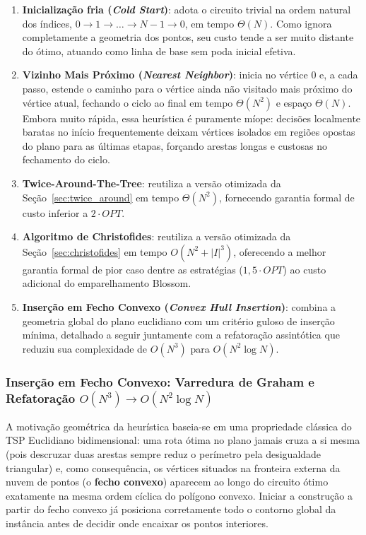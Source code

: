 \begin{enumerate}
  \item \textbf{Inicialização fria (\textit{Cold Start})}: adota o circuito trivial na ordem
  natural dos índices, $0 \rightarrow 1 \rightarrow \dots \rightarrow N - 1 \rightarrow 0$, em
  tempo $\Theta(N)$. Como ignora completamente a geometria dos pontos, seu custo tende a ser
  muito distante do ótimo, atuando como linha de base sem poda inicial efetiva.

  \item \textbf{Vizinho Mais Próximo (\textit{Nearest Neighbor})}: inicia no vértice $0$ e, a
  cada passo, estende o caminho para o vértice ainda não visitado mais próximo do vértice atual,
  fechando o ciclo ao final em tempo $\Theta(N^2)$ e espaço $\Theta(N)$. Embora muito rápida,
  essa heurística é puramente míope: decisões localmente baratas no início frequentemente deixam
  vértices isolados em regiões opostas do plano para as últimas etapas, forçando arestas longas
  e custosas no fechamento do ciclo.

  \item \textbf{Twice-Around-The-Tree}: reutiliza a versão otimizada da
  Seção~\ref{sec:twice_around} em tempo $\Theta(N^2)$, fornecendo garantia formal de custo
  inferior a $2 \cdot OPT$.

  \item \textbf{Algoritmo de Christofides}: reutiliza a versão otimizada da
  Seção~\ref{sec:christofides} em tempo $O(N^2 + |I|^3)$, oferecendo a melhor garantia formal de
  pior caso dentre as estratégias ($1{,}5 \cdot OPT$) ao custo adicional do emparelhamento
  Blossom.

  \item \textbf{Inserção em Fecho Convexo (\textit{Convex Hull Insertion})}: combina a
  geometria global do plano euclidiano com um critério guloso de inserção mínima, detalhado a
  seguir juntamente com a refatoração assintótica que reduziu sua complexidade de $O(N^3)$ para
  $O(N^2 \log N)$.
\end{enumerate}

\subsubsection{Inserção em Fecho Convexo: Varredura de Graham e Refatoração \texorpdfstring{$O(N^3) \rightarrow O(N^2 \log N)$}{O(N3) -> O(N2 log N)}}
\label{sec:convex_hull_refactoring}

A motivação geométrica da heurística baseia-se em uma propriedade clássica do TSP Euclidiano
bidimensional: uma rota ótima no plano jamais cruza a si mesma (pois descruzar duas arestas
sempre reduz o perímetro pela desigualdade triangular) e, como consequência, os vértices
situados na fronteira externa da nuvem de pontos (o \textbf{fecho convexo}) aparecem ao longo
do circuito ótimo exatamente na mesma ordem cíclica do polígono convexo. Iniciar a construção
a partir do fecho convexo já posiciona corretamente todo o contorno global da instância antes
de decidir onde encaixar os pontos interiores.

